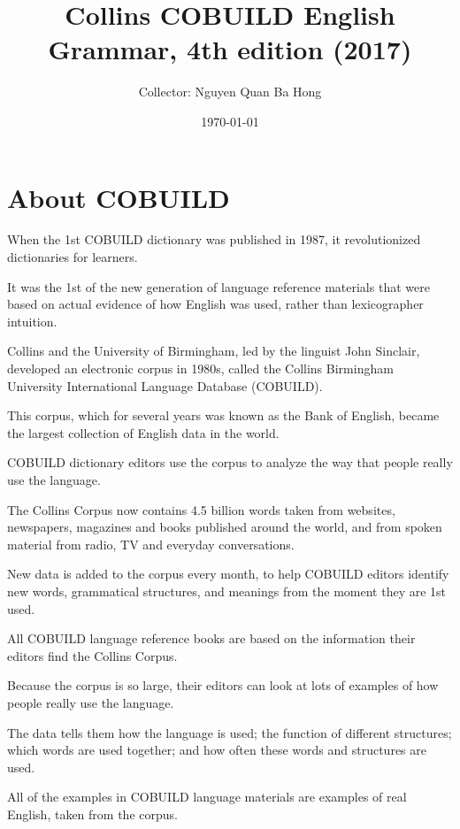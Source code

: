 \documentclass[oneside]{book}
\title{Collins COBUILD English Grammar, 4th edition (2017) }
\author{Collector: Nguyen Quan Ba Hong}
\date{\today}
\numberwithin{equation}{section}
\begin{document}
\maketitle
\setcounter{secnumdepth}{6}
\setcounter{tocdepth}{6}
\tableofcontents


\section{About COBUILD}
When the 1st COBUILD dictionary was published in 1987, it revolutionized dictionaries for learners.

It was the 1st of the new generation of language reference materials that were based on actual evidence of how English was used, rather than lexicographer intuition.

%
Collins and the University of Birmingham, led by the linguist John Sinclair, developed an electronic corpus in 1980s, called the Collins Birmingham University International Language Database (COBUILD).

This corpus, which for several years was known as the Bank of English\textcopyright, became the largest collection of English data in the world.

COBUILD dictionary editors use the corpus to analyze the way that people really use the language.

%
The Collins Corpus now contains 4.5 billion words taken from websites, newspapers, magazines and books published around the world, and from spoken material from radio, TV and everyday conversations.

New data is added to the corpus every month, to help COBUILD editors identify new words, grammatical structures, and meanings from the moment they are 1st used.

%
All COBUILD language reference books are based on the information their editors find the Collins Corpus.

Because the corpus is so large, their editors can look at lots of examples of how people really use the language.

The data tells them how the language is used; the function of different structures; which words are used together; and how often these words and structures are used.

%
All of the examples in COBUILD language materials are examples of real English, taken from the corpus.
\end{document}
